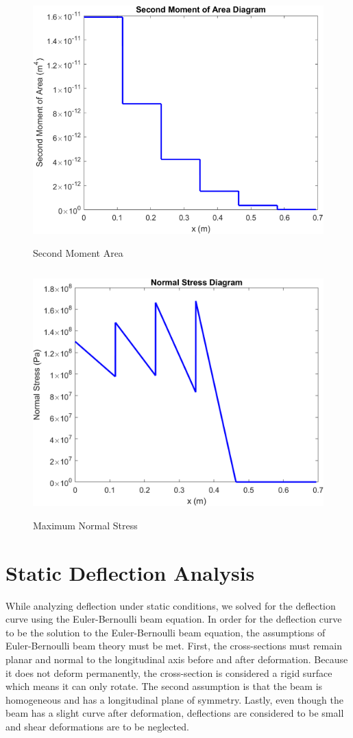 \documentclass[12pt]{article}
\begin{document}
\begin{figure}[H]
\centering
\includegraphics[height= 9.5cm, width= 12.5cm]{Second_Moment_of_Area.png}
\caption{Second Moment Area}
\label{Figure 5}
\end{figure}

\begin{figure}[H]
\centering
\includegraphics[height= 9.5cm, width= 12.5cm]{curve_Normal_Stress.png}
\caption{Maximum Normal Stress}
\label{Figure 6}
\end{figure}
\newpage

\section{Static Deflection Analysis}
While analyzing deflection under static conditions, we solved for the deflection curve using the Euler-Bernoulli beam equation. In order for the deflection curve to be the solution to the Euler-Bernoulli beam equation, the assumptions of Euler-Bernoulli beam theory must be met. First, the cross-sections must remain planar and normal to the longitudinal axis before and after deformation. Because it does not deform permanently, the cross-section is considered a rigid surface which means it can only rotate. The second assumption is that the beam is homogeneous and has a longitudinal plane of symmetry. Lastly, even though the beam has a slight curve after deformation, deflections are considered to be small and shear deformations are to be neglected.
\setlength{\parindent}{0cm}
\end{document}
